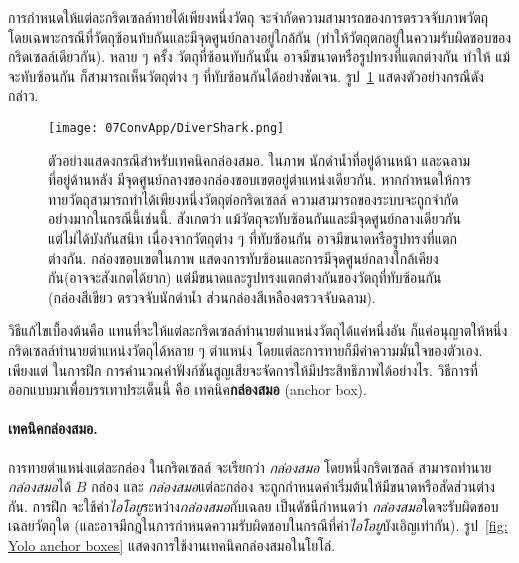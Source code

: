 การกำหนดให้แต่ละกริดเซลล์ทายได้เพียงหนึ่งวัตถุ จะจำกัดความสามารถของการตรวจจับภาพวัตถุ
โดยเฉพาะกรณีที่วัตถุซ้อนท้บกันและมีจุดศูนย์กลางอยู่ใกล้กัน (ทำให้วัตถุตกอยู่ในความรับผิดชอบของกริดเซลล์เดียวกัน).
หลาย ๆ ครั้ง วัตถุที่ซ้อนทับกันนั้น อาจมีขนาดหรือรูปทรงที่แตกต่างกัน ทำให้ แม้จะทับซ้อนกัน ก็สามารถเห็นวัตถุต่าง ๆ ที่ทับซ้อนกันได้อย่างชัดเจน.
รูป~\ref{fig: example shows need for anchor box} แสดงตัวอย่างกรณีดังกล่าว.

%
\begin{figure}
	\begin{center}
		\texttt{[image: 07ConvApp/DiverShark.png]}
		\caption[ตัวอย่างแสดงกรณีสำหรับเทคนิคกล่องสมอ]{ตัวอย่างแสดงกรณีสำหรับเทคนิคกล่องสมอ.
ในภาพ นักดำน้ำที่อยู่ด้านหน้า และฉลามที่อยู่ด้านหลัง มีจุดศูนย์กลางของกล่องขอบเขตอยู่ตำแหน่งเดียวกัน.
หากกำหนดให้การทายวัตถุสามารถทำได้เพียงหนึ่งวัตถุต่อกริดเซลล์ ความสามารถของระบบจะถูกจำกัดอย่างมากในกรณีนี้เช่นนี้.
สังเกตว่า แม้วัตถุจะทับซ้อนกันและมีจุดศูนย์กลางเดียวกันแต่ไม่ได้บังกันสนิท 
เนื่องจากวัตถุต่าง ๆ ที่ทับซ้อนกัน อาจมีขนาดหรือรูปทรงที่แตกต่างกัน.
กล่องขอบเขตในภาพ แสดงการทับซ้อนและการมีจุดศูนย์กลางใกล้เคียงกัน(อาจจะสังเกตได้ยาก) แต่มีขนาดและรูปทรงแตกต่างกันของวัตถุที่ทับซ้อนกัน 
(กล่องสีเขียว ตรวจจับนักดำน้ำ ส่วนกล่องสีเหลืองตรวจจับฉลาม).
}
		\label{fig: example shows need for anchor box}
	\end{center}
\end{figure}
%

วิธีแก้ไขเบื้องต้นคือ 
แทนที่จะให้แต่ละกริดเซลล์ทำนายตำแหน่งวัตถุได้แค่หนึ่งอัน ก็แค่อนุญาตให้หนึ่งกริดเซลล์ทำนายตำแหน่งวัตถุได้หลาย ๆ ตำแหน่ง โดยแต่ละการทายก็มีค่าความมั่นใจของตัวเอง.
เพียงแต่ ในการฝึก การคำนวณค่าฟังก์ชันสูญเสียจะจัดการให้มีประสิทธิภาพได้อย่างไร.
วิธีการที่ออกแบบมาเพื่อบรรเทาประเด็นนี้ คือ เทคนิค\textbf{กล่องสมอ} (anchor box\cite{FasterRCNN2015}).

\paragraph{เทคนิคกล่องสมอ.} 
การทายตำแหน่งแต่ละกล่อง ในกริดเซลล์ จะเรียกว่า \textit{กล่องสมอ} 
โดยหนึ่งกริดเซลล์ สามารถทำนาย\textit{กล่องสมอ}ได้ $B$ กล่อง
และ \textit{กล่องสมอ}แต่ละกล่อง จะถูกกำหนดค่าเริ่มต้นให้มีขนาดหรือสัดส่วนต่างกัน.
การฝึก จะใช้ค่า\textit{ไอโอยู}ระหว่าง\textit{กล่องสมอ}กับเฉลย เป็นดัชนีกำหนดว่า \textit{กล่องสมอ}ใดจะรับผิดชอบเฉลยวัตถุใด (และอาจมีกฎในการกำหนดความรับผิดชอบในกรณีที่ค่า\textit{ไอโอยู}บังเอิญเท่ากัน).
รูป~\ref{fig: Yolo anchor boxes} แสดงการใช้งานเทคนิคกล่องสมอในโยโล่.

